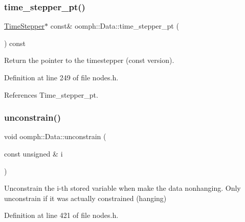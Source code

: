 \mbox{\label{classoomph_1_1Data_acd3e933171913b8cf3f4f0c4020ad449}} 
\subsubsection{\texorpdfstring{time\+\_\+stepper\+\_\+pt()}{time\_stepper\_pt()}\hspace{0.1cm}{\footnotesize\ttfamily [2/2]}}
{\footnotesize\ttfamily \hyperlink{classoomph_1_1TimeStepper}{Time\+Stepper}$\ast$ const\& oomph\+::\+Data\+::time\+\_\+stepper\+\_\+pt (\begin{DoxyParamCaption}{ }\end{DoxyParamCaption}) const\hspace{0.3cm}{\ttfamily [inline]}}



Return the pointer to the timestepper (const version). 



Definition at line 249 of file nodes.\+h.



References Time\+\_\+stepper\+\_\+pt.

\mbox{\label{classoomph_1_1Data_accb670734a29a841e9ead16b703626ce}} 
\subsubsection{\texorpdfstring{unconstrain()}{unconstrain()}}
{\footnotesize\ttfamily void oomph\+::\+Data\+::unconstrain (\begin{DoxyParamCaption}\item[{const unsigned \&}]{i }\end{DoxyParamCaption})\hspace{0.3cm}{\ttfamily [inline]}}



Unconstrain the i-\/th stored variable when make the data nonhanging. Only unconstrain if it was actually constrained (hanging) 



Definition at line 421 of file nodes.\+h.



